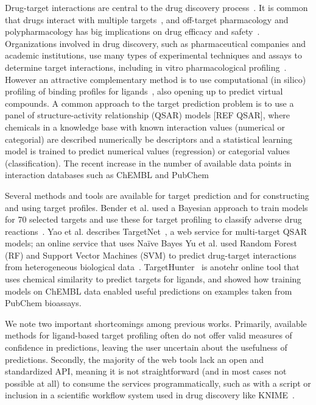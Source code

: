 \documentclass[10pt,article]{memoir}
\begin{document}
Drug-target interactions are central to the drug discovery
process~\cite{Yildirim:2007vh}. It is common that drugs interact with multiple
targets~\cite{hopkins2008network}, and off-target pharmacology and
polypharmacology has big implications on drug efficacy and
safety~\cite{Peters:2013yg,Ravikumar:2018qd}. Organizations involved in drug
discovery, such as pharmaceutical companies and academic institutions, use many
types of experimental techniques and assays to determine target interactions,
including in vitro pharmacological profiling~\cite{Bowes2012}. However an
attractive complementary method is to use computational (in silico) profiling
of binding profiles for ligands~\cite{Cereto-Massague:2015px}, also opening up
to predict virtual compounds. A common approach to the target prediction
problem is to use a panel of structure-activity relationship (QSAR) models [REF
QSAR], where chemicals in a knowledge base with known interaction values
(numerical or categorial) are described numerically be descriptors and a
statistical learning model is trained to predict numerical values (regression)
or categorial values (classification). The recent increase in the number of
available data points in interaction databases such as ChEMBL and PubChem

Several methods and tools are available for target prediction and for
constructing and using target profiles. 
%
Bender et al. used a Bayesian approach to train models for 70 selected targets
and use these for target profiling to classify adverse drug
reactions~\cite{Bender:2007ib}.
%
Yao et al. describes TargetNet~\cite{Yao:2016ij}, a web service for
multi-target QSAR models; an online service that uses Na\"ive Bayes 
%
Yu et al. used Random Forest (RF) and Support Vector Machines (SVM) to predict
drug-target interactions from heterogeneous biological data~\cite{Yu:2012ol}.
%
TargetHunter~\cite{Wang:2013le} is anotehr online tool that uses chemical
similarity to predict targets for ligands, and showed how training models on
ChEMBL data enabled useful predictions on examples taken from PubChem
bioassays.

We note two important shortcomings among previous works. Primarily, available
methods for ligand-based target profiling often do not offer valid measures of
confidence in predictions, leaving the user uncertain about the usefulness of
predictions. Secondly, the majority of the web tools lack an open and
standardized API, meaning it is not straightforward (and in most cases not
possible at all) to consume the services programmatically, such as with a
script or inclusion in a scientific workflow system used in drug discovery like
KNIME~\cite{Mazanetz:2012gy}.
\end{document}
